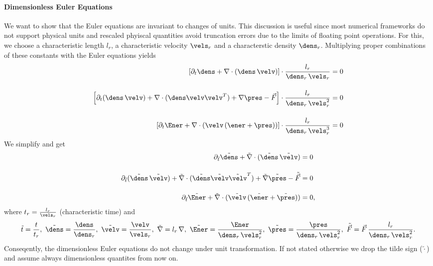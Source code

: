 \paragraph{Dimensionless Euler Equations} We want to show that the Euler
equations are invariant to changes of units. This discussion is useful since
most numerical frameworks do not support physical units and rescaled phyiscal
quantities avoid truncation errors due to the limits of floating point
operations. For this, we choose a characteristic length $l_r$, a characteristic
velocity $\vels_r$ and a characterstic density $\dens_r$. Multiplying proper
combinations of these constants with the Euler equations yields
\begin{align}
\left[\partial_t\dens + \nabla \cdot (\dens\,\velv)\right] \cdot \frac{l_r}{\dens_r\,\vels_r} &=  0\\[0.4cm]
\left[\partial_t(\dens\,\velv) + \nabla\cdot(\dens\velv\velv^T) + \nabla \pres - \vec{F}\right] \cdot \frac{l_r}{\dens_r\,\vels_r^2} &= 0\\[0.4cm]
\left[\partial_t \Ener + \nabla \cdot (\velv\,(\ener + \pres))\right] \cdot \frac{l_r}{\dens_r\,\vels_r^3} &=  0
\end{align}
We simplify and get
\begin{align}
\partial_{\tilde{t}} \tilde{\dens} + \tilde{\nabla} \cdot (\tilde{\dens}\,\tilde{\velv})   &=  0\\[0.4cm]
\partial_{\tilde{t}}(\tilde{\dens} \,\tilde{\velv}) +      \tilde{\nabla}\cdot(\tilde{\dens}\tilde{\velv}\tilde{\velv}^T) + \tilde{\nabla} \tilde{\pres} - \tilde{\vec{F}}&= 0\\[0.4cm]
\partial_{\tilde{t}} \tilde{\Ener} + \tilde{\nabla} \cdot (\tilde{\velv}\,(\tilde{\ener} + \tilde{\pres})) &=  0,
\end{align}
where $t_r = \frac{l_r}{\vels_r}$ (characteristic time) and
\begin{equation}
\tilde{t} = \frac{t}{t_r},\ 
\tilde{\dens} = \frac{\dens}{\dens_r},\
\tilde{\velv} = \frac{\velv}{\vels_r},\ 
\tilde{\nabla} = l_r\,\nabla,\ 
\tilde{\Ener} = \frac{\Ener}{\dens_r\,\vels_r^2},\ 
\tilde{\pres} = \frac{\pres}{\dens_r\,\vels_r^2},\ 
\tilde{\vec{F}} = \vec{F} \, \frac{l_r}{\dens_r\,\vels_r^2}.
\end{equation}
Conseqently, the dimensionless Euler equations do not change under unit transformation. If not
stated otherwise we drop the tilde sign ($\tilde{\cdot}$) and assume always
dimensionless quantites from now on.


